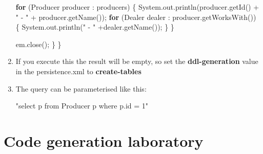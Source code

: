 \documentclass[]{report}
\newenvironment{Shaded}{}{}
\newcommand{\KeywordTok}[1]{\textcolor[rgb]{0.00,0.44,0.13}{\textbf{{#1}}}}
\newcommand{\StringTok}[1]{\textcolor[rgb]{0.25,0.44,0.63}{{#1}}}
\newcommand{\FunctionTok}[1]{\textcolor[rgb]{0.02,0.16,0.49}{{#1}}}
\newcommand{\NormalTok}[1]{{#1}}
\begin{document}
\begin{enumerate}
\begin{Shaded}
\begin{Highlighting}[]
        \KeywordTok{for} \NormalTok{(Producer producer : producers) \{}
            \NormalTok{System.}\FunctionTok{out}\NormalTok{.}\FunctionTok{println}\NormalTok{(producer.}\FunctionTok{getId}\NormalTok{() + }\StringTok{" - "} \NormalTok{+ producer.}\FunctionTok{getName}\NormalTok{());}
            \KeywordTok{for} \NormalTok{(Dealer dealer : producer.}\FunctionTok{getWorksWith}\NormalTok{()) \{}
                \NormalTok{System.}\FunctionTok{out}\NormalTok{.}\FunctionTok{println}\NormalTok{(}\StringTok{"    - "} \NormalTok{+dealer.}\FunctionTok{getName}\NormalTok{());}
            \NormalTok{\}}
        \NormalTok{\}}

        \NormalTok{em.}\FunctionTok{close}\NormalTok{();}
    \NormalTok{\}}
\NormalTok{\}}
\end{Highlighting}
\end{Shaded}
\item
  If you execute this the result will be empty, so set the
  \textbf{ddl-generation} value in the persistence.xml to
  \textbf{create-tables}
\item
  The query can be parameterised like this:

\begin{Shaded}
\begin{Highlighting}[]
\StringTok{"select p from Producer p where p.id = 1"}
\end{Highlighting}
\end{Shaded}
\end{enumerate}

\chapter{Code generation laboratory}
\end{document}
